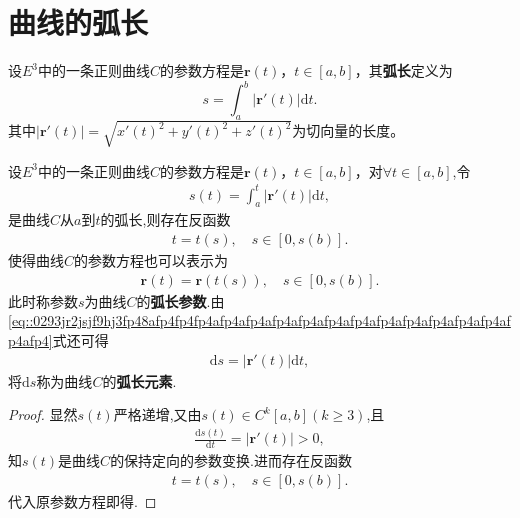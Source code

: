 \documentclass[../../main.tex]{subfiles}%
\begin{document}
\section{曲线的弧长}

\begin{definition}[曲线的弧长]
设$E^3$中的一条正则曲线$C$的参数方程是$\bm{r}(t)$，$t\in[a,b]$，其\textbf{弧长}定义为
\[
s = \int_a^b \big|\bm{r}'(t)\big|\mathrm{d}t.
\]
其中$\big|\bm{r}'(t)\big|=\sqrt{x'(t)^2+y'(t)^2+z'(t)^2}$为切向量的长度。
\end{definition}

\begin{theorem}
设$E^3$中的一条正则曲线$C$的参数方程是$\bm{r}(t)$，$t\in[a,b]$，对$\forall t\in \left[ a,b \right]$,令
\begin{align*}
s\left( t \right) =\int_a^t{\left| \bm{r}' \left( t \right) \right|\mathrm{d}t},
\end{align*}
是曲线$C$从$a$到$t$的弧长,则存在反函数
\begin{align}\label{eq::0293jr2jsjf9hj3fp48afp4fp4fp4afp4afp4afp4afp4afp4afp4afp4afp4afp4afp4afp4afp4afp4}
t=t\left( s \right),\quad s\in \left[ 0,s\left( b \right) \right].
\end{align}
使得曲线$C$的参数方程也可以表示为
\begin{align*}
\bm{r}\left( t \right) =\bm{r}\left( t\left( s \right) \right),\quad s\in \left[ 0,s\left( b \right) \right].
\end{align*}
此时称参数$s$为曲线$C$的\textbf{弧长参数}.由\eqref{eq::0293jr2jsjf9hj3fp48afp4fp4fp4afp4afp4afp4afp4afp4afp4afp4afp4afp4afp4afp4afp4afp4}式还可得
\begin{align}\label{eq:9j03jj3f0j9090u9i9i0iu3th47gh}
\mathrm{d}s=\left| \boldsymbol{r}'\left( t \right) \right|\mathrm{d}t,
\end{align}
将$\mathrm{d}s$称为曲线$C$的\textbf{弧长元素}.
\end{theorem}
\begin{proof}

显然$s\left( t \right)$严格递增,又由$s\left( t \right) \in C^k\left[ a,b \right] \left( k\geqslant 3 \right)$,且
\begin{align*}
\frac{\mathrm{d}s\left( t \right)}{\mathrm{d}t}=\left| \bm{r}' \left( t \right) \right|>0,
\end{align*}
知$s\left( t \right)$是曲线$C$的保持定向的参数变换.进而存在反函数
\begin{align*}
t=t\left( s \right),\quad s\in \left[ 0,s\left( b \right) \right].
\end{align*}
代入原参数方程即得.

\end{proof}
\end{document}
